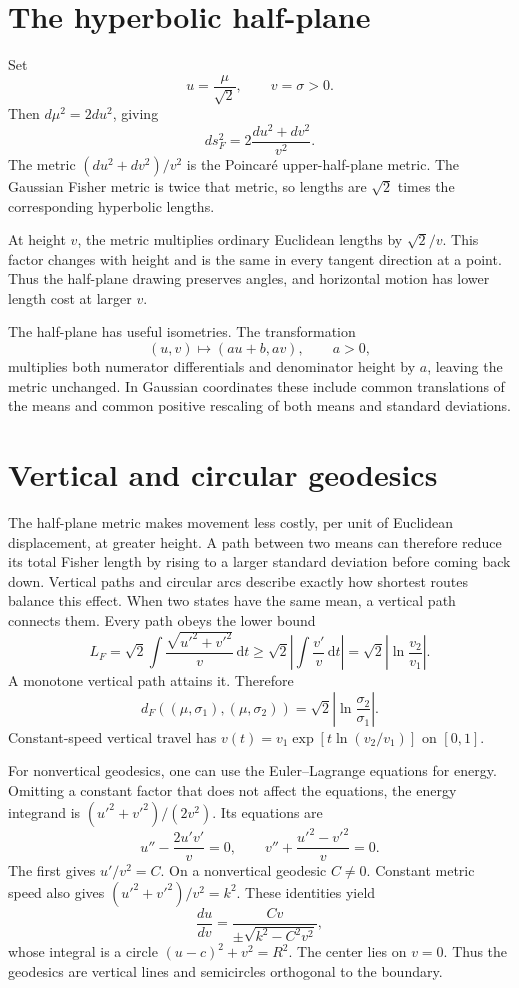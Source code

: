 \documentclass[11pt,oneside,openany]{book}
\theoremstyle{definition}
\theoremstyle{remark}
\newcommand{\dd}{\,\mathrm{d}}
\numberwithin{equation}{chapter}
\begin{document}
\section{The hyperbolic half-plane}
Set
\[
u=\frac{\mu}{\sqrt2},\qquad v=\sigma>0.
\]
Then $d\mu^2=2du^2$, giving
\begin{equation}\label{eq:hyperbolicmetric}
\boxed{ds_F^2=2\frac{du^2+dv^2}{v^2}.}
\end{equation}
The metric $(du^2+dv^2)/v^2$ is the Poincar\'e upper-half-plane metric. The Gaussian Fisher metric is twice that metric, so lengths are $\sqrt2$ times the corresponding hyperbolic lengths.

At height $v$, the metric multiplies ordinary Euclidean lengths by $\sqrt2/v$. This factor changes with height and is the same in every tangent direction at a point. Thus the half-plane drawing preserves angles, and horizontal motion has lower length cost at larger $v$.

The half-plane has useful isometries. The transformation
\[
(u,v)\longmapsto(au+b,av),\qquad a>0,
\]
multiplies both numerator differentials and denominator height by $a$, leaving the metric unchanged. In Gaussian coordinates these include common translations of the means and common positive rescaling of both means and standard deviations.

\section{Vertical and circular geodesics}
The half-plane metric makes movement less costly, per unit of Euclidean displacement, at greater height. A path between two means can therefore reduce its total Fisher length by rising to a larger standard deviation before coming back down. Vertical paths and circular arcs describe exactly how shortest routes balance this effect.
When two states have the same mean, a vertical path connects them. Every path obeys the lower bound
\[
L_F=\sqrt2\int\frac{\sqrt{u'^2+v'^2}}v\dd t
\geq\sqrt2\left|\int\frac{v'}v\dd t\right|
=\sqrt2\left|\ln\frac{v_2}{v_1}\right|.
\]
A monotone vertical path attains it. Therefore
\begin{equation}\label{eq:verticaldistance}
d_F((\mu,\sigma_1),(\mu,\sigma_2))
=\sqrt2\left|\ln\frac{\sigma_2}{\sigma_1}\right|.
\end{equation}
Constant-speed vertical travel has $v(t)=v_1\exp[t\ln(v_2/v_1)]$ on $[0,1]$.

For nonvertical geodesics, one can use the Euler--Lagrange equations for energy. Omitting a constant factor that does not affect the equations, the energy integrand is $(u'^2+v'^2)/(2v^2)$. Its equations are
\begin{equation}\label{eq:hyperbolicgeoeq}
u''-\frac{2u'v'}v=0,\qquad
v''+\frac{u'^2-v'^2}v=0.
\end{equation}
The first gives $u'/v^2=C$. On a nonvertical geodesic $C\ne0$. Constant metric speed also gives $(u'^2+v'^2)/v^2=k^2$. These identities yield
\[
\frac{du}{dv}=\frac{Cv}{\pm\sqrt{k^2-C^2v^2}},
\]
whose integral is a circle $(u-c)^2+v^2=R^2$. The center lies on $v=0$. Thus the geodesics are vertical lines and semicircles orthogonal to the boundary.
\end{document}
